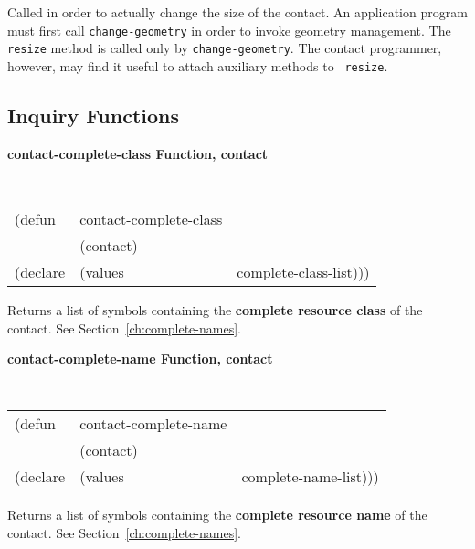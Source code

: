 \begin{flushright} \parbox[t]{6.125in}{
Called in order to actually change the size of the contact.
An application program must first call {\tt change-geometry} 
in
order to invoke geometry management. The {\tt resize} method is  called
only by {\tt change-geometry}.
The contact programmer, however, may find it useful to attach auxiliary methods to {\tt
resize}.


}\end{flushright}

\subsection*{Inquiry Functions}

{\samepage
{\large {\bf contact-complete-class \hfill Function, contact}}
\begin{flushright} \parbox[t]{6.125in}{
\tt
\begin{tabular}{lll}
\raggedright
(defun & contact-complete-class & \\
& (contact) \\
(declare & (values & complete-class-list)))
\end{tabular}
\rm
}\end{flushright}
}

\begin{flushright} \parbox[t]{6.125in}{
Returns a list of symbols containing the {\bf complete resource class} of the contact.
See Section~\ref{ch:complete-names}.

}\end{flushright}


{\samepage
{\large {\bf contact-complete-name \hfill Function, contact}}
\begin{flushright}
\parbox[t]{6.125in}{
\tt
\begin{tabular}{lll}
\raggedright
(defun & contact-complete-name & \\
& (contact) \\
(declare & (values & complete-name-list)))
\end{tabular}
}\end{flushright}}

\begin{flushright}
\parbox[t]{6.125in}{
Returns a list of symbols containing the {\bf complete resource name} of the contact.
See Section~\ref{ch:complete-names}.
}\end{flushright}


